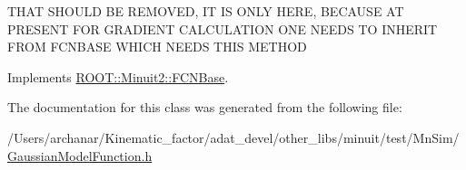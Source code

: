T\+H\+AT S\+H\+O\+U\+LD BE R\+E\+M\+O\+V\+ED, IT IS O\+N\+LY H\+E\+RE, B\+E\+C\+A\+U\+SE AT P\+R\+E\+S\+E\+NT F\+OR G\+R\+A\+D\+I\+E\+NT C\+A\+L\+C\+U\+L\+A\+T\+I\+ON O\+NE N\+E\+E\+DS TO I\+N\+H\+E\+R\+IT F\+R\+OM F\+C\+N\+B\+A\+SE W\+H\+I\+CH N\+E\+E\+DS T\+H\+IS M\+E\+T\+H\+OD 

Implements \mbox{\hyperlink{classROOT_1_1Minuit2_1_1FCNBase_a04ef08ddad92ce8d89d498efbe021c39}{R\+O\+O\+T\+::\+Minuit2\+::\+F\+C\+N\+Base}}.



The documentation for this class was generated from the following file\+:\begin{DoxyCompactItemize}
\item 
/\+Users/archanar/\+Kinematic\+\_\+factor/adat\+\_\+devel/other\+\_\+libs/minuit/test/\+Mn\+Sim/\mbox{\hyperlink{GaussianModelFunction_8h}{Gaussian\+Model\+Function.\+h}}\end{DoxyCompactItemize}
